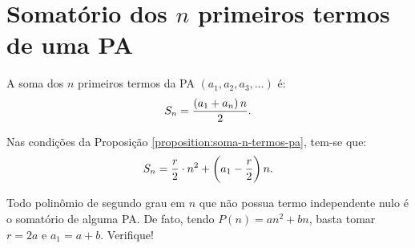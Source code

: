 \section{Somatório dos $n$ primeiros termos de uma PA}

\begin{proposition}
\label{proposition:soma-n-termos-pa}
A soma dos $n$ primeiros termos da PA $(a_1, a_2, a_3, \dots)$ é:
%
\begin{equation*}
S_n = \frac {\left(a_1+a_n\right)n} 2.
\end{equation*}
\end{proposition}

\begin{corollary}
Nas condições da Proposição \ref{proposition:soma-n-termos-pa}, tem-se que:
%
\begin{equation*}
S_n = \frac r 2 \cdot n^2 + \left(a_1 - \frac r 2\right)n.
\end{equation*}
\end{corollary}

\begin{remark}
Todo polinômio de segundo grau em $n$ que não possua termo independente nulo é o somatório de alguma PA. De fato, tendo $P(n) = an^2 + bn$, basta tomar $r = 2a$ e $a_1 = a+b$. Verifique!
\end{remark}